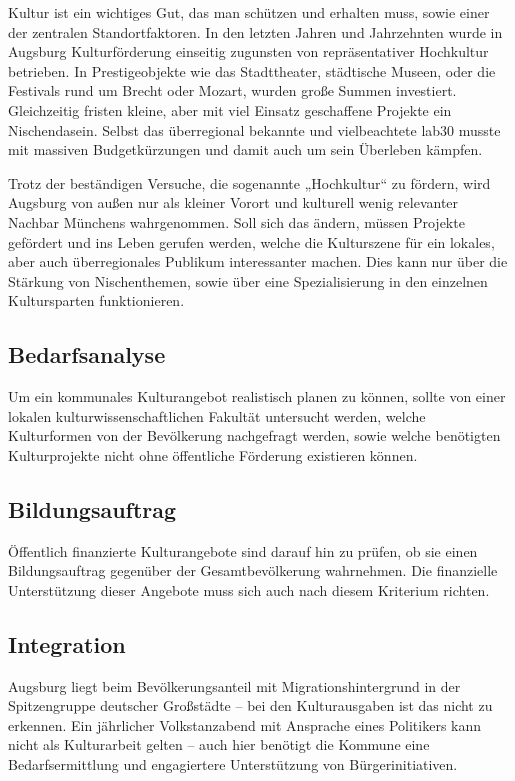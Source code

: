   Kultur ist ein wichtiges Gut, das man schützen und erhalten muss, sowie 
  einer der zentralen Standortfaktoren. In den letzten Jahren und Jahrzehnten 
  wurde in Augsburg Kulturförderung einseitig zugunsten von repräsentativer 
  Hochkultur betrieben. In Prestigeobjekte wie das Stadttheater, städtische 
  Museen, oder die Festivals rund um Brecht oder Mozart, wurden große Summen 
  investiert. Gleichzeitig fristen kleine, aber mit viel Einsatz geschaffene 
  Projekte ein Nischendasein. Selbst das überregional bekannte und 
  vielbeachtete lab30 musste mit massiven Budgetkürzungen und damit auch um 
  sein Überleben kämpfen.
  
  Trotz der beständigen Versuche, die sogenannte „Hochkultur“ zu fördern, 
  wird Augsburg von außen nur als kleiner Vorort und kulturell wenig 
  relevanter Nachbar Münchens wahrgenommen. Soll sich das ändern, müssen 
  Projekte gefördert und ins Leben gerufen werden, welche die Kulturszene für 
  ein lokales, aber auch überregionales Publikum interessanter machen. Dies 
  kann nur über die Stärkung von Nischenthemen, sowie über eine 
  Spezialisierung in den einzelnen Kultursparten funktionieren.
  
  \subsection{Bedarfsanalyse}
  
  Um ein kommunales Kulturangebot realistisch planen zu können, sollte von 
  einer lokalen kulturwissenschaftlichen Fakultät untersucht werden, welche 
  Kulturformen von der Bevölkerung nachgefragt werden, sowie welche benötigten 
  Kulturprojekte nicht ohne öffentliche Förderung existieren können.
  
  \subsection{Bildungsauftrag}
  
  Öffentlich finanzierte Kulturangebote sind darauf hin zu prüfen, ob sie 
  einen Bildungsauftrag gegenüber der Gesamtbevölkerung wahrnehmen. Die 
  finanzielle Unterstützung dieser Angebote muss sich auch nach diesem 
  Kriterium richten.
  
  \subsection{Integration}
  
  Augsburg liegt beim Bevölkerungsanteil mit Migrationshintergrund in der 
  Spitzengruppe deutscher Großstädte – bei den Kulturausgaben ist das nicht 
  zu erkennen. Ein jährlicher Volkstanzabend mit Ansprache eines Politikers 
  kann nicht als Kulturarbeit gelten – auch hier benötigt die Kommune eine 
  Bedarfsermittlung und engagiertere Unterstützung von Bürgerinitiativen.
  
